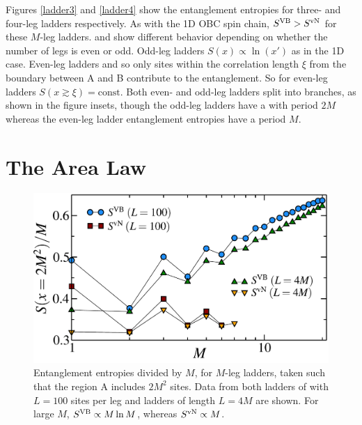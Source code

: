  Figures \ref{ladder3} and \ref{ladder4} show the entanglement entropies for three- and four-leg ladders respectively.
 As with the 1D OBC spin chain, $S^{\text{VB}} > S^{\text{vN}}$ for these $M$-leg ladders.
 \vn and \vb show different behavior depending on whether the number of legs is even or odd.
 Odd-leg ladders 
 $S(x) \propto \ln(x')$ as in the 1D case.
 Even-leg ladders  and so only sites within the correlation length $\xi$ from the boundary between A and B contribute to the entanglement.
So for even-leg ladders $S(x\gtrsim\xi) = \text{const}$.
Both even- and odd-leg ladders split into branches, as shown in the figure insets, though the odd-leg ladders have a  with period $2M$ whereas the even-leg ladder entanglement entropies have a period $M$. 
  
 
\section{The Area Law}

\begin{figure} { \includegraphics[width=6in]{./figures/paper1/figure4/4fig.pdf}
 \caption[Area Law in 2D Heis model]{
Entanglement entropies divided by $M$,  for $M$-leg ladders, taken such that
the region A includes $2M^2$ sites.  
Data from both ladders of  with $L=100$ sites per leg and ladders of length $L=4M$ 
 are shown.
For large $M$, $S^{\rm VB}\propto M \ln M$,
whereas $S^{\rm vN}\propto M$.   
\label{zigzag}}} 
\end{figure}
